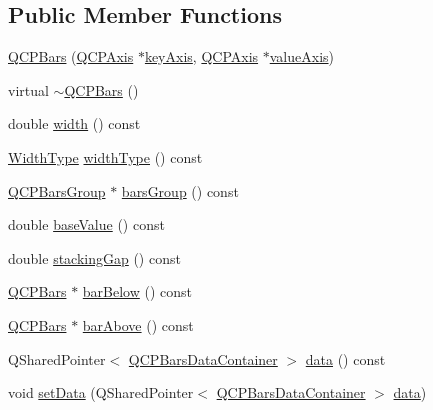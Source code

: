 \subsection*{Public Member Functions}
\begin{DoxyCompactItemize}
\item 
\hyperlink{class_q_c_p_bars_a64006999ad9dff308f40df41cef176ad}{Q\+C\+P\+Bars} (\hyperlink{class_q_c_p_axis}{Q\+C\+P\+Axis} $\ast$\hyperlink{class_q_c_p_abstract_plottable_a2cdd6f0dd5e9a979037f86b4000d9cfe}{key\+Axis}, \hyperlink{class_q_c_p_axis}{Q\+C\+P\+Axis} $\ast$\hyperlink{class_q_c_p_abstract_plottable_af47809a644a68ffd955fb30b01fb4f2f}{value\+Axis})
\item 
virtual \hyperlink{class_q_c_p_bars_a4d880e28031ef120603f543379be2f22}{$\sim$\+Q\+C\+P\+Bars} ()
\item 
double \hyperlink{class_q_c_p_bars_abe7eb3987d8711f45829db879aee2280}{width} () const
\item 
\hyperlink{class_q_c_p_bars_a65dbbf1ab41cbe993d71521096ed4649}{Width\+Type} \hyperlink{class_q_c_p_bars_a4c103fb405a45f47853e0345f0c6e708}{width\+Type} () const
\item 
\hyperlink{class_q_c_p_bars_group}{Q\+C\+P\+Bars\+Group} $\ast$ \hyperlink{class_q_c_p_bars_a5eef59840b68d205df4e0c3df5f97633}{bars\+Group} () const
\item 
double \hyperlink{class_q_c_p_bars_a29a7b3b86f80b2a04bd1f9ec0ebaf422}{base\+Value} () const
\item 
double \hyperlink{class_q_c_p_bars_a2e6192fa9c16df7ba94cd50c0c9ec7ce}{stacking\+Gap} () const
\item 
\hyperlink{class_q_c_p_bars}{Q\+C\+P\+Bars} $\ast$ \hyperlink{class_q_c_p_bars_a1b58664864b141f45e02044a855b3213}{bar\+Below} () const
\item 
\hyperlink{class_q_c_p_bars}{Q\+C\+P\+Bars} $\ast$ \hyperlink{class_q_c_p_bars_ab97f2acd9f6cb40d2cc3c33d278f0e78}{bar\+Above} () const
\item 
Q\+Shared\+Pointer$<$ \hyperlink{qcustomplot_8h_a52bf589c9fce1baa36c1d40d69785d46}{Q\+C\+P\+Bars\+Data\+Container} $>$ \hyperlink{class_q_c_p_bars_a7e373a534d82e18ed27b3fafd1f08fae}{data} () const
\item 
void \hyperlink{class_q_c_p_bars_a6dc562ec7120a8521e1061f2134367e4}{set\+Data} (Q\+Shared\+Pointer$<$ \hyperlink{qcustomplot_8h_a52bf589c9fce1baa36c1d40d69785d46}{Q\+C\+P\+Bars\+Data\+Container} $>$ \hyperlink{class_q_c_p_bars_a7e373a534d82e18ed27b3fafd1f08fae}{data})
\item 

\end{DoxyCompactItemize}
